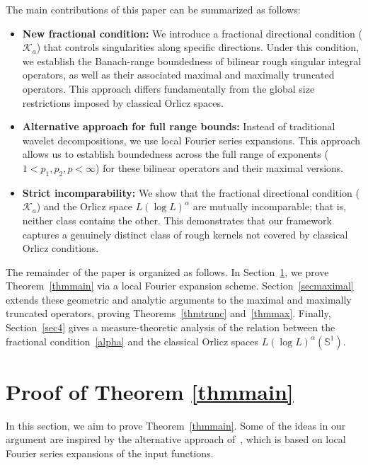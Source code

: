\documentclass[11pt]{amsart}
\begin{document}
The main contributions of this paper can be summarized as follows:

\begin{itemize}
	\item \textbf{New fractional condition:} We introduce a fractional directional condition ($\mathcal{K}_a$)  that controls singularities along specific directions. Under this condition, we establish the Banach-range boundedness of bilinear rough singular integral operators, as well as their associated maximal and maximally truncated operators. This approach differs fundamentally from the global size restrictions imposed by classical Orlicz spaces.
	\item \textbf{Alternative approach for full range bounds:} Instead of traditional wavelet decompositions, we use local Fourier series expansions. This approach allows us to establish boundedness across the full range of exponents ($1 < p_1, p_2, p < \infty$) for these bilinear operators and their maximal versions.
	
		\item \textbf{Strict incomparability:} We show that the fractional directional condition ($\mathcal{K}_a$) and the Orlicz space $L(\log L)^\alpha$ are mutually incomparable; that is, neither class contains the other. This demonstrates that our framework captures a genuinely distinct class of rough kernels not covered by classical Orlicz conditions.
		
\end{itemize}

The remainder of the paper is organized as follows. In Section~\ref{sec2}, we prove Theorem~\ref{thmmain} via a local Fourier expansion scheme. Section~\ref{secmaximal} extends these geometric and analytic arguments to the maximal and maximally truncated operators, proving Theorems~\ref{thmtrunc} and~\ref{thmmax}. Finally, Section~\ref{sec4} gives a measure-theoretic analysis of the relation between the fractional condition~\eqref{alpha} and the classical Orlicz spaces $L(\log L)^\alpha(\mathbb{S}^{1})$.

\section{\bf Proof of Theorem \ref{thmmain}}\label{sec2}

In this section, we aim to prove Theorem~\ref{thmmain}.  Some of the ideas in our argument are inspired by the alternative approach of~\cite{bhojak2025alternate}, which is based on local Fourier series expansions of the input functions.
\end{document}
